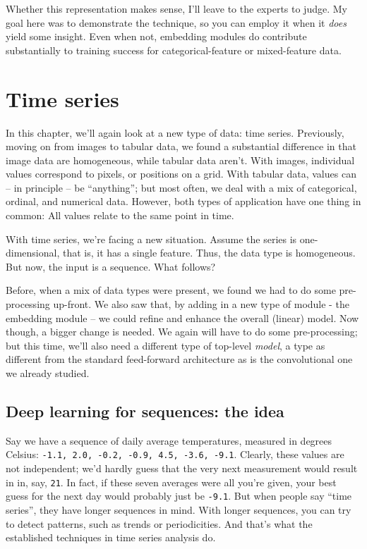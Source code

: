 \documentclass[
  letterpaper,
]{krantz}
\begin{document}
Whether this representation makes sense, I'll leave to the experts to
judge. My goal here was to demonstrate the technique, so you can employ
it when it \emph{does} yield some insight. Even when not, embedding
modules do contribute substantially to training success for
categorical-feature or mixed-feature data.

\hypertarget{sec:time-series}{%
\chapter{Time series}\label{sec:time-series}}

In this chapter, we'll again look at a new type of data: time series.
Previously, moving on from images to tabular data, we found a
substantial difference in that image data are homogeneous, while tabular
data aren't. With images, individual values correspond to pixels, or
positions on a grid. With tabular data, values can -- in principle -- be
``anything''; but most often, we deal with a mix of categorical,
ordinal, and numerical data. However, both types of application have one
thing in common: All values relate to the same point in time.

With time series, we're facing a new situation. Assume the series is
one-dimensional, that is, it has a single feature. Thus, the data type
is homogeneous. But now, the input is a sequence. What follows?

Before, when a mix of data types were present, we found we had to do
some pre-processing up-front. We also saw that, by adding in a new type
of module - the embedding module -- we could refine and enhance the
overall (linear) model. Now though, a bigger change is needed. We again
will have to do some pre-processing; but this time, we'll also need a
different type of top-level \emph{model}, a type as different from the
standard feed-forward architecture as is the convolutional one we
already studied.

\hypertarget{deep-learning-for-sequences-the-idea}{%
\section{Deep learning for sequences: the
idea}\label{deep-learning-for-sequences-the-idea}}

Say we have a sequence of daily average temperatures, measured in
degrees Celsius: \texttt{-1.1,\ 2.0,\ -0.2,\ -0.9,\ 4.5,\ -3.6,\ -9.1}.
Clearly, these values are not independent; we'd hardly guess that the
very next measurement would result in in, say, \texttt{21}. In fact, if
these seven averages were all you're given, your best guess for the next
day would probably just be \texttt{-9.1}. But when people say ``time
series'', they have longer sequences in mind. With longer sequences, you
can try to detect patterns, such as trends or periodicities. And that's
what the established techniques in time series analysis do.
\end{document}

